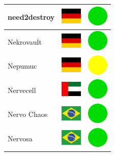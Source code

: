 \documentclass[12pt, a4paper, twoside]{report}
\begin{document}
\begin{center}
\begin{longtable}{|p{5cm}|p{2cm}|p{2cm}|}
 need2destroy                                               & \includegraphics[width=1cm]{../img/flags/de} &   \includegraphics[width=1cm]{../likes/y} \\ \hline
 Nekrovault                                                 & \includegraphics[width=1cm]{../img/flags/de} &   \includegraphics[width=1cm]{../likes/y} \\ \hline
 Nepumuc                                                    & \includegraphics[width=1cm]{../img/flags/de} &   \includegraphics[width=1cm]{../likes/m} \\ \hline
 Nervecell                                                  & \includegraphics[width=1cm]{../img/flags/ae} &   \includegraphics[width=1cm]{../likes/y} \\ \hline
 Nervo Chaos                                                & \includegraphics[width=1cm]{../img/flags/br} &   \includegraphics[width=1cm]{../likes/y} \\ \hline
 Nervosa                                                    & \includegraphics[width=1cm]{../img/flags/br} &   \includegraphics[width=1cm]{../likes/y} \\ \hline

\end{longtable}
\end{center}
\end{document}
